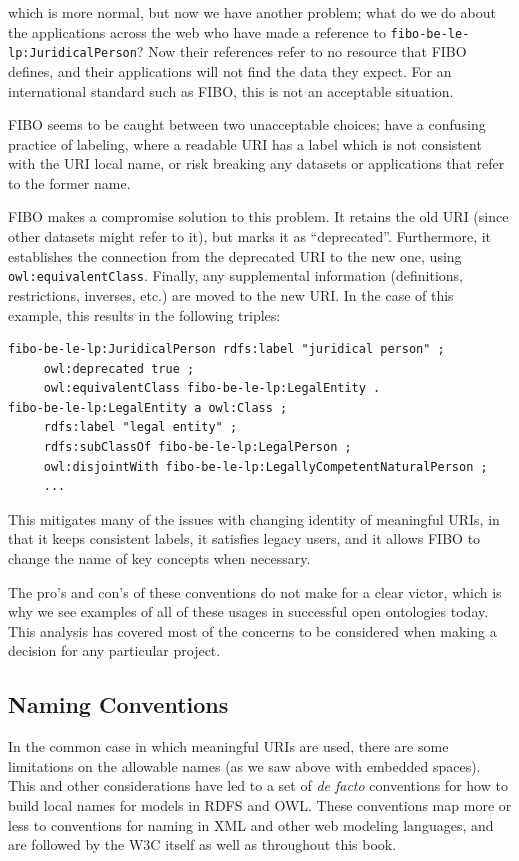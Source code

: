 which is more normal, but now we have another problem; what do we do about the applications
across the web who have made a reference to \texttt{fibo-be-le-lp:JuridicalPerson}?  
Now their references refer to no resource that FIBO defines, and their applications
will not find the data they expect.  For an international standard such as FIBO, this
is not an acceptable situation. 

FIBO seems to be caught between two unacceptable choices; have a confusing
practice of labeling, where a readable URI has a label which is not consistent
with the URI local name, or risk breaking any datasets or applications that refer to 
the former name.  

FIBO makes a compromise solution to this problem.  It retains the old URI (since 
other datasets might refer to it), but marks it as ``deprecated''.  Furthermore, it 
establishes the connection from the deprecated URI to the new one, 
using \texttt{owl:equivalentClass}.  Finally, any supplemental information
(definitions, restrictions, inverses, etc.) are moved to the new URI.  In the case of 
this example, this results in the following triples: 

\begin{lstlisting}
fibo-be-le-lp:JuridicalPerson rdfs:label "juridical person" ;
     owl:deprecated true ;
     owl:equivalentClass fibo-be-le-lp:LegalEntity .
fibo-be-le-lp:LegalEntity a owl:Class ;
     rdfs:label "legal entity" ;
     rdfs:subClassOf fibo-be-le-lp:LegalPerson ;
     owl:disjointWith fibo-be-le-lp:LegallyCompetentNaturalPerson ;
     ...
\end{lstlisting}


This mitigates many of the issues with changing identity of meaningful URIs, in that 
it keeps consistent labels, it satisfies legacy users, and it allows FIBO to 
change the name of key concepts when necessary.  

The pro's and con's of these conventions do not make for a clear victor, which is 
why we see examples of all of these usages in successful open ontologies today.  
This analysis has covered most of the concerns to be considered when making a
decision for any particular project. 

\subsection{Naming Conventions}

In the common case in which meaningful URIs are used, there are some limitations
on the allowable names (as we saw above with embedded spaces).  This and other 
considerations have led to a set of \emph{de facto} conventions for how to build
local names for models in RDFS and OWL.  These conventions map more or less to conventions
for naming in XML and other web modeling languages, and are followed by the W3C
itself as well as throughout this book.


